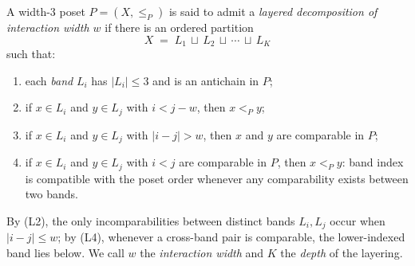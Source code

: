 \begin{definition}\label{def:layered}
A width-$3$ poset $P=(X,\le_P)$ is said to admit a \emph{layered
decomposition of interaction width $w$} if there is an ordered
partition
\[
  X \;=\; L_1 \,\sqcup\, L_2 \,\sqcup\, \cdots \,\sqcup\, L_K
\]
such that:
\begin{enumerate}[nosep, label=(L\arabic*)]
 \item\label{item:L1} each \emph{band} $L_i$ has $|L_i| \le 3$ and is
 an antichain in $P$;
 \item if $x \in L_i$ and $y \in L_j$ with $i < j - w$, then
 $x <_P y$;
 \item\label{item:L3} if $x \in L_i$ and $y \in L_j$ with
 $|i-j| > w$, then $x$ and $y$ are comparable in $P$;
 \item\label{item:L4} if $x \in L_i$ and $y \in L_j$ with $i < j$ are
 comparable in $P$, then $x <_P y$: band index is compatible with
 the poset order whenever any comparability exists between two
 bands.
\end{enumerate}
By (L2), the only incomparabilities between distinct bands $L_i, L_j$
occur when $|i-j| \le w$; by (L4), whenever a cross-band pair is
comparable, the lower-indexed band lies below. We call $w$ the
\emph{interaction width} and $K$ the \emph{depth} of the layering.
\end{definition}

